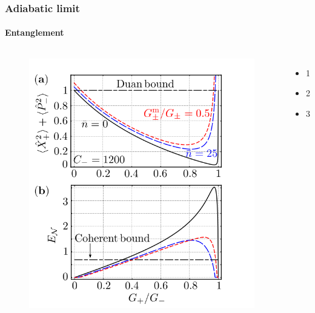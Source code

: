 \documentclass[aspectratio=43]{beamer}
\begin{document}
\begin{frame}
	
	\frametitle{Adiabatic limit}
	\framesubtitle{Entanglement}
	
	\begin{columns}
		
		
		\begin{figure}
			\includegraphics[width = 6 cm]{plots/plot_entanglement.png}
		\end{figure}	
	
		
		\begin{itemize}
			\item 1
			\item 2
			\item 3
		\end{itemize}
		
	\end{columns}

\end{frame}
\end{document}
